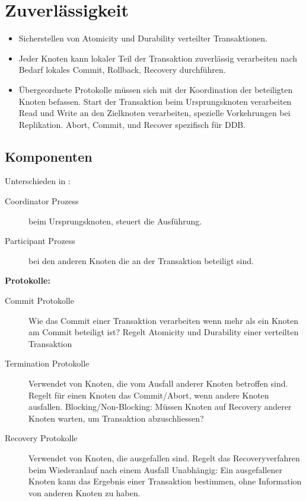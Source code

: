 \documentclass[a4paper,10pt,titlepage=false]{scrreprt}
\begin{document}
\section{Zuverlässigkeit} %
\label{sec:zuverl_ssigkeit}
\begin{itemize}
  \item Sicherstellen von Atomicity und Durability verteilter Transaktionen.
  \item Jeder Knoten kann
  \subitem lokaler Teil der Transaktion zuverlässig verarbeiten
  \subitem nach Bedarf lokales Commit, Rollback, Recovery durchführen.
  \item Übergeordnete Protokolle müssen sich mit der Koordination der beteiligten Knoten befassen.
  \subitem Start der Transaktion beim Ursprungsknoten verarbeiten
  \subitem  Read und Write an den Zielknoten verarbeiten, spezielle Vorkehrungen bei Replikation.
  \subitem Abort, Commit, und Recover spezifisch für DDB.
\end{itemize}
\subsection{Komponenten} %
\label{sub:komponenten}
Unterschieden in :
\begin{description}
  \item[Coordinator Prozess]beim Ursprungsknoten, steuert die Ausführung.
  \item[Participant Prozess] bei den anderen Knoten die an der Transaktion beteiligt sind. 
\end{description}
\textbf{Protokolle:}\\
\begin{description}
  \item[Commit Protokolle] Wie das Commit einer Transaktion verarbeiten
wenn mehr als ein Knoten am Commit beteiligt ist?
Regelt Atomicity und Durability einer verteilten Transaktion
\item[Termination Protokolle] Verwendet von Knoten, die vom Ausfall anderer Knoten
betroffen sind.
Regelt für einen Knoten das Commit/Abort,
wenn andere Knoten ausfallen.
Blocking/Non-Blocking: Müssen Knoten auf Recovery anderer
Knoten warten, um Transaktion abzuschliessen?
\item [Recovery Protokolle]Verwendet von Knoten, die ausgefallen sind.
Regelt das Recoveryverfahren beim Wiederanlauf
nach einem Ausfall
Unabhängig: Ein ausgefallener Knoten kann das Ergebnis einer
Transaktion bestimmen, ohne Information von anderen Knoten
zu haben.

\end{description}
\end{document}
